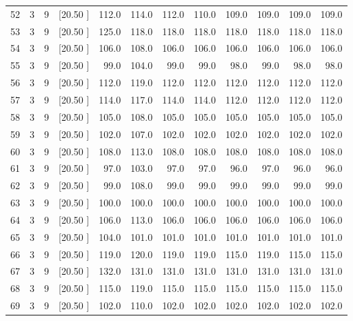 \documentclass[12pt,a4paper]{article}
\begin{document}
\begin{center}
{\begin{tabular}{r r r r r r r r r r r r}
  52&  3&  9&[20.50     ]&   112.0&   114.0&   112.0&   110.0&   109.0&   109.0&   109.0&   109.0\\[-0.02in]
  53&  3&  9&[20.50     ]&   125.0&   118.0&   118.0&   118.0&   118.0&   118.0&   118.0&   118.0\\[-0.02in]
  54&  3&  9&[20.50     ]&   106.0&   108.0&   106.0&   106.0&   106.0&   106.0&   106.0&   106.0\\[-0.02in]
  55&  3&  9&[20.50     ]&    99.0&   104.0&    99.0&    99.0&    98.0&    99.0&    98.0&    98.0\\[-0.02in]
  56&  3&  9&[20.50     ]&   112.0&   119.0&   112.0&   112.0&   112.0&   112.0&   112.0&   112.0\\[-0.02in]
  57&  3&  9&[20.50     ]&   114.0&   117.0&   114.0&   114.0&   112.0&   112.0&   112.0&   112.0\\[-0.02in]
  58&  3&  9&[20.50     ]&   105.0&   108.0&   105.0&   105.0&   105.0&   105.0&   105.0&   105.0\\[-0.02in]
  59&  3&  9&[20.50     ]&   102.0&   107.0&   102.0&   102.0&   102.0&   102.0&   102.0&   102.0\\[-0.02in]
  60&  3&  9&[20.50     ]&   108.0&   113.0&   108.0&   108.0&   108.0&   108.0&   108.0&   108.0\\[-0.02in]
  61&  3&  9&[20.50     ]&    97.0&   103.0&    97.0&    97.0&    96.0&    97.0&    96.0&    96.0\\[-0.02in]
  62&  3&  9&[20.50     ]&    99.0&   108.0&    99.0&    99.0&    99.0&    99.0&    99.0&    99.0\\[-0.02in]
  63&  3&  9&[20.50     ]&   100.0&   100.0&   100.0&   100.0&   100.0&   100.0&   100.0&   100.0\\[-0.02in]
  64&  3&  9&[20.50     ]&   106.0&   113.0&   106.0&   106.0&   106.0&   106.0&   106.0&   106.0\\[-0.02in]
  65&  3&  9&[20.50     ]&   104.0&   101.0&   101.0&   101.0&   101.0&   101.0&   101.0&   101.0\\[-0.02in]
  66&  3&  9&[20.50     ]&   119.0&   120.0&   119.0&   119.0&   115.0&   119.0&   115.0&   115.0\\[-0.02in]
  67&  3&  9&[20.50     ]&   132.0&   131.0&   131.0&   131.0&   131.0&   131.0&   131.0&   131.0\\[-0.02in]
  68&  3&  9&[20.50     ]&   115.0&   119.0&   115.0&   115.0&   115.0&   115.0&   115.0&   115.0\\[-0.02in]
  69&  3&  9&[20.50     ]&   102.0&   110.0&   102.0&   102.0&   102.0&   102.0&   102.0&   102.0\\[-0.02in]

\end{tabular}}
\end{center}
\end{document}

